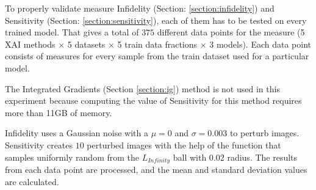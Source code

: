 To properly validate measure Infidelity (Section: \ref{section:infidelity}) and Sensitivity (Section: \ref{section:sensitivity}), each of them has to be tested on every trained model. That gives a total of $375$ different data points for the measure (5 XAI methods $\times$ 5 datasets $\times$ 5 train data fractions $\times$ 3 models). Each data point consists of measures for every sample from the train dataset used for a particular model.

\begin{remark}
The Integrated Gradients (Section \ref{section:ig}) method is not used in this experiment because computing the value of Sensitivity for this method requires more than 11GB of memory.
\end{remark}

Infidelity uses a Gaussian noise with a $\mu = 0$ and $\sigma = 0.003$ to perturb images. Sensitivity creates $10$ perturbed images with the help of the function that samples uniformly random from the $L_{Infinity}$ ball with $0.02$ radius. The results from each data point are processed, and the mean and standard deviation values are calculated. 
